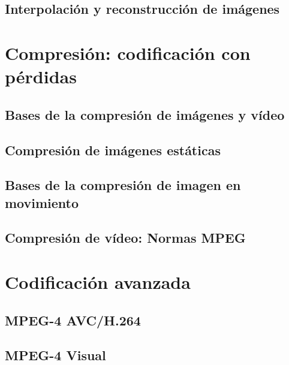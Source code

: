 \documentclass[10pt]{book}
\begin{document}
\section{Interpolación y reconstrucción de imágenes}



\chapter{Compresión: codificación con pérdidas}

\section{Bases de la compresión de imágenes y vídeo}

\section{Compresión de imágenes estáticas}

\section{Bases de la compresión de imagen en movimiento}

\section{Compresión de vídeo: Normas MPEG}



\chapter{Codificación avanzada}

\section{MPEG-4 AVC/H.264}

\section{MPEG-4 Visual}
\end{document}
